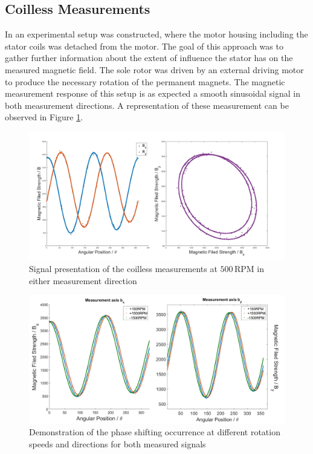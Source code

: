 \documentclass[english]{isasthesis}
\begin{document}
    \subsection{Coilless Measurements} \label{coilless measurements}
    	In \cite{mayerposition} an experimental setup was constructed, where the motor housing including the stator coils was detached from the motor. The goal of this approach was to gather further information about the extent of influence the stator has on the measured magnetic field. The sole rotor was driven by an external driving motor to produce the necessary rotation of the permanent magnets. The magnetic measurement response of this setup is as expected a smooth sinusoidal signal in both measurement directions. A representation of these measurement can be observed in Figure \ref{fig:coilless signal overview}.
		\begin{figure}[t]
    		\begin{center}
    			\includegraphics[width=1\textwidth]{figures/coilless_signal_overview.jpg}   
  			\end{center}
    		\caption{Signal presentation of the coilless measurements at $500\,$RPM in either measurement direction}
    		\label{fig:coilless signal overview}
    		\end{figure}
    		\begin{figure}[t]
    		\begin{center}
    			\includegraphics[width=1\textwidth]{figures/coilles_phase_shift.jpg}   
  			\end{center}
    		\caption{Demonstration of the phase shifting occurrence at different rotation speeds and directions for both measured signals}
    		\label{fig:coilless signal phase shift}
    		\end{figure}  
\end{document}
